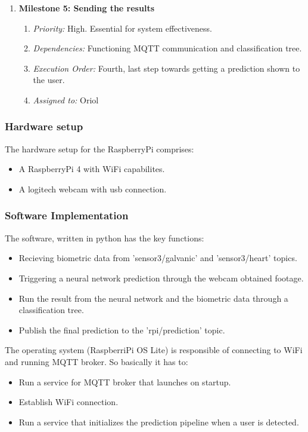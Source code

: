 \begin{enumerate}
    \item \textbf{Milestone 5: Sending the results}
        \begin{enumerate}
            \item \textit{Priority:} High. Essential for system effectiveness.
            \item \textit{Dependencies:} Functioning MQTT communication and classification tree.
            \item \textit{Execution Order:} Fourth, last step towards getting a prediction shown to the user.
            \item \textit{Assigned to:} Oriol
        \end{enumerate}
\end{enumerate}

\subsubsection{Hardware setup}
The hardware setup for the RaspberryPi comprises:
\begin{itemize}
    \item A RaspberryPi 4 with WiFi capabilites.
    \item A logitech webcam with usb connection.
\end{itemize}

\subsubsection{Software Implementation}
The software, written in python has the key functions:
\begin{itemize}
    \item Recieving biometric data from 'sensor3/galvanic' and 'sensor3/heart' topics.
    \item Triggering a neural network prediction through the webcam obtained footage.
    \item Run the result from the neural network and the biometric data through a classification tree.
    \item Publish the final prediction to the 'rpi/prediction' topic.
\end{itemize}
The operating system (RaspberriPi OS Lite) is responsible of connecting to WiFi and running MQTT broker. So basically it has to:
\begin{itemize}
    \item Run a service for MQTT broker that launches on startup.
    \item Establish WiFi connection.
    \item Run a service that initializes the prediction pipeline when a user is detected.
\end{itemize}

